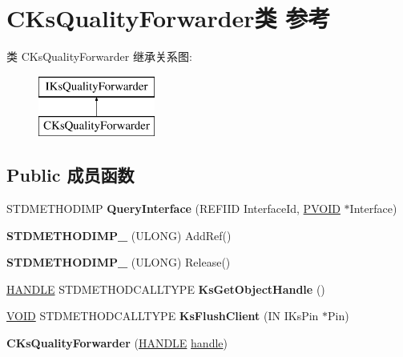 \hypertarget{class_c_ks_quality_forwarder}{}\section{C\+Ks\+Quality\+Forwarder类 参考}
\label{class_c_ks_quality_forwarder}
类 C\+Ks\+Quality\+Forwarder 继承关系图\+:\begin{figure}[H]
\begin{center}
\leavevmode
\includegraphics[height=2.000000cm]{class_c_ks_quality_forwarder}
\end{center}
\end{figure}
\subsection*{Public 成员函数}
\begin{DoxyCompactItemize}
\item 
\mbox{\label{class_c_ks_quality_forwarder_afb531a1ecf086a45174bf74a8ea52b7e}} 
S\+T\+D\+M\+E\+T\+H\+O\+D\+I\+MP {\bfseries Query\+Interface} (R\+E\+F\+I\+ID Interface\+Id, \hyperlink{interfacevoid}{P\+V\+O\+ID} $\ast$Interface)
\item 
\mbox{\label{class_c_ks_quality_forwarder_aa493f595cec37020740f79a54199fb03}} 
{\bfseries S\+T\+D\+M\+E\+T\+H\+O\+D\+I\+M\+P\+\_\+} (U\+L\+O\+NG) Add\+Ref()
\item 
\mbox{\label{class_c_ks_quality_forwarder_a7fd677a7495ac5356dbcf612e224e9f0}} 
{\bfseries S\+T\+D\+M\+E\+T\+H\+O\+D\+I\+M\+P\+\_\+} (U\+L\+O\+NG) Release()
\item 
\mbox{\label{class_c_ks_quality_forwarder_a11040010997c121016088013c1cefd9d}} 
\hyperlink{interfacevoid}{H\+A\+N\+D\+LE} S\+T\+D\+M\+E\+T\+H\+O\+D\+C\+A\+L\+L\+T\+Y\+PE {\bfseries Ks\+Get\+Object\+Handle} ()
\item 
\mbox{\label{class_c_ks_quality_forwarder_ac9b27e8153f6f949032ee34dfc826e8a}} 
\hyperlink{interfacevoid}{V\+O\+ID} S\+T\+D\+M\+E\+T\+H\+O\+D\+C\+A\+L\+L\+T\+Y\+PE {\bfseries Ks\+Flush\+Client} (IN I\+Ks\+Pin $\ast$Pin)
\item 
\mbox{\label{class_c_ks_quality_forwarder_ad190dd5d87d2c1b49f52da17cf6981d9}} 
{\bfseries C\+Ks\+Quality\+Forwarder} (\hyperlink{interfacevoid}{H\+A\+N\+D\+LE} \hyperlink{structhandle}{handle})
\end{DoxyCompactItemize}
